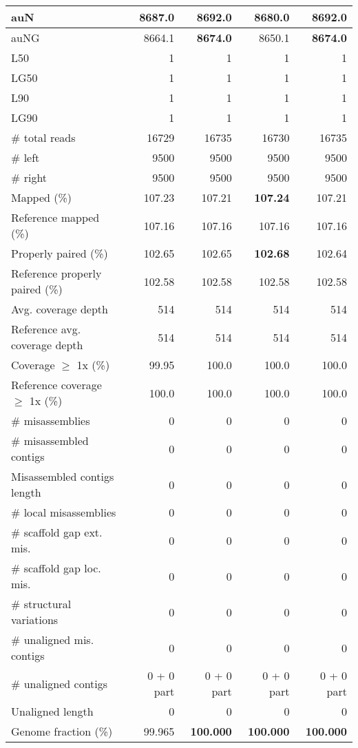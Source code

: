 \documentclass[12pt,a4paper]{article}
\begin{document}
\begin{table}[ht]
\begin{center}
\begin{tabular}{|l*{4}{|r}|}
auN & 8687.0 & {\bf 8692.0} & 8680.0 & {\bf 8692.0} \\ \hline
auNG & 8664.1 & {\bf 8674.0} & 8650.1 & {\bf 8674.0} \\ \hline
L50 & 1 & 1 & 1 & 1 \\ \hline
LG50 & 1 & 1 & 1 & 1 \\ \hline
L90 & 1 & 1 & 1 & 1 \\ \hline
LG90 & 1 & 1 & 1 & 1 \\ \hline
\# total reads & 16729 & 16735 & 16730 & 16735 \\ \hline
\# left & 9500 & 9500 & 9500 & 9500 \\ \hline
\# right & 9500 & 9500 & 9500 & 9500 \\ \hline
Mapped (\%) & 107.23 & 107.21 & {\bf 107.24} & 107.21 \\ \hline
Reference mapped (\%) & 107.16 & 107.16 & 107.16 & 107.16 \\ \hline
Properly paired (\%) & 102.65 & 102.65 & {\bf 102.68} & 102.64 \\ \hline
Reference properly paired (\%) & 102.58 & 102.58 & 102.58 & 102.58 \\ \hline
Avg. coverage depth & 514 & 514 & 514 & 514 \\ \hline
Reference avg. coverage depth & 514 & 514 & 514 & 514 \\ \hline
Coverage $\geq$ 1x (\%) & 99.95 & 100.0 & 100.0 & 100.0 \\ \hline
Reference coverage $\geq$ 1x (\%) & 100.0 & 100.0 & 100.0 & 100.0 \\ \hline
\# misassemblies & 0 & 0 & 0 & 0 \\ \hline
\# misassembled contigs & 0 & 0 & 0 & 0 \\ \hline
Misassembled contigs length & 0 & 0 & 0 & 0 \\ \hline
\# local misassemblies & 0 & 0 & 0 & 0 \\ \hline
\# scaffold gap ext. mis. & 0 & 0 & 0 & 0 \\ \hline
\# scaffold gap loc. mis. & 0 & 0 & 0 & 0 \\ \hline
\# structural variations & 0 & 0 & 0 & 0 \\ \hline
\# unaligned mis. contigs & 0 & 0 & 0 & 0 \\ \hline
\# unaligned contigs & 0 + 0 part & 0 + 0 part & 0 + 0 part & 0 + 0 part \\ \hline
Unaligned length & 0 & 0 & 0 & 0 \\ \hline
Genome fraction (\%) & 99.965 & {\bf 100.000} & {\bf 100.000} & {\bf 100.000} \\ \hline

\end{tabular}
\end{center}
\end{table}
\end{document}
